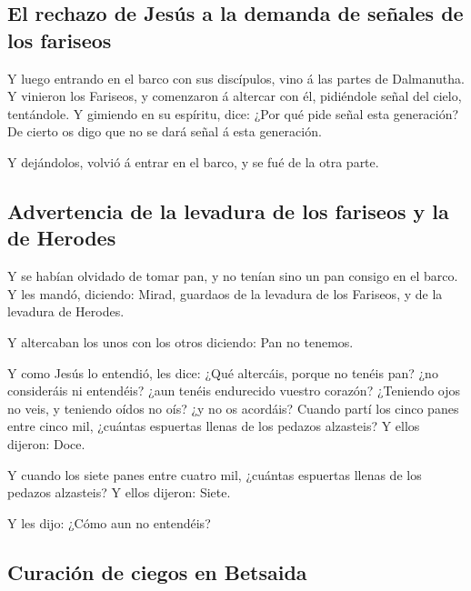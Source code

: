 \hypertarget{el-rechazo-de-jesuxfas-a-la-demanda-de-seuxf1ales-de-los-fariseos}{%
\subsection{El rechazo de Jesús a la demanda de señales de los
fariseos}\label{el-rechazo-de-jesuxfas-a-la-demanda-de-seuxf1ales-de-los-fariseos}}

 Y luego entrando en el barco con sus discípulos, vino á
las partes de Dalmanutha.  Y vinieron los Fariseos, y
comenzaron á altercar con él, pidiéndole señal del cielo, tentándole.
 Y gimiendo en su espíritu, dice: ¿Por qué pide señal
esta generación? De cierto os digo que no se dará señal á esta
generación.

 Y dejándolos, volvió á entrar en el barco, y se fué de
la otra parte.

\hypertarget{advertencia-de-la-levadura-de-los-fariseos-y-la-de-herodes}{%
\subsection{Advertencia de la levadura de los fariseos y la de
Herodes}\label{advertencia-de-la-levadura-de-los-fariseos-y-la-de-herodes}}

 Y se habían olvidado de tomar pan, y no tenían sino un
pan consigo en el barco.  Y les mandó, diciendo: Mirad,
guardaos de la levadura de los Fariseos, y de la levadura de Herodes.

 Y altercaban los unos con los otros diciendo: Pan no
tenemos.

 Y como Jesús lo entendió, les dice: ¿Qué altercáis,
porque no tenéis pan? ¿no consideráis ni entendéis? ¿aun tenéis
endurecido vuestro corazón?  ¿Teniendo ojos no veis, y
teniendo oídos no oís? ¿y no os acordáis?  Cuando partí
los cinco panes entre cinco mil, ¿cuántas espuertas llenas de los
pedazos alzasteis? Y ellos dijeron: Doce.

 Y cuando los siete panes entre cuatro mil, ¿cuántas
espuertas llenas de los pedazos alzasteis? Y ellos dijeron: Siete.

 Y les dijo: ¿Cómo aun no entendéis?

\hypertarget{curaciuxf3n-de-ciegos-en-betsaida}{%
\subsection{Curación de ciegos en
Betsaida}\label{curaciuxf3n-de-ciegos-en-betsaida}}

